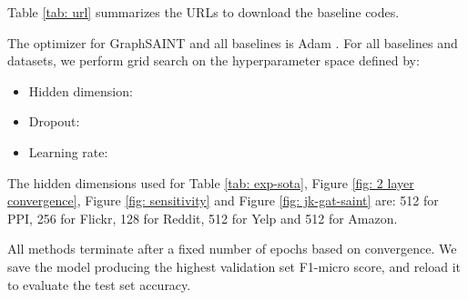 \documentclass{article} \usepackage{iclr2020_conference,times}
\newcommand{\graphsaint}{{\fontfamily{lmtt}\selectfont GraphSAINT}}
\begin{document}
Table \ref{tab: url} summarizes the URLs to download the baseline codes. 





The optimizer for {\graphsaint} and all baselines is Adam \citep{adam}. 
For all baselines and datasets, we perform grid search on the hyperparameter space defined by:
\begin{itemize}
    \item Hidden dimension: 
    \item Dropout: 
    \item Learning rate: 
\end{itemize}
The hidden dimensions used for Table \ref{tab: exp-sota}, Figure \ref{fig: 2 layer convergence}, Figure \ref{fig: sensitivity} and Figure \ref{fig: jk-gat-saint} are: 512 for PPI, 256 for Flickr, 128 for Reddit, 512 for Yelp and 512 for Amazon. 





All methods terminate after a fixed number of epochs based on convergence.
We save the model producing the highest validation set F1-micro score, and reload it to evaluate the test set accuracy. 
\end{document}
